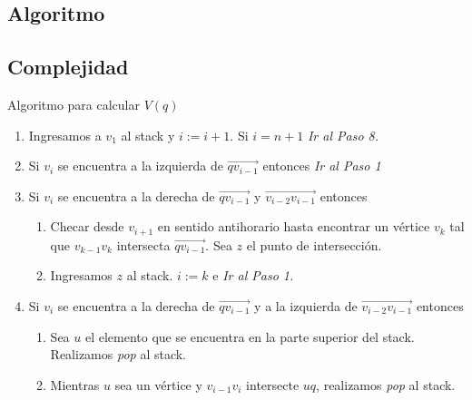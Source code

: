 \documentclass[aspectratio=169,xcolor=dvipsnames, t]{beamer}
\begin{document}

\subsection{Algoritmo}
\subsection{Complejidad}

\begin{frame}{Algoritmo para calcular $V(q)$}
    \begin{enumerate}
            \item Ingresamos a $v_{1}$ al stack y $i := i + 1$. Si $i = n + 1$ \textit{Ir al Paso 8.}
            \item Si $v_{i}$ se encuentra a la izquierda de $\overrightarrow{qv_{i-1}}$ entonces \textit{Ir al Paso 1}
            \item Si $v_{i}$ se encuentra a la derecha de $\overrightarrow{qv_{i-1}}$ y $\overrightarrow{v_{i-2}v_{i-1}}$ entonces
                \begin{enumerate}
                    \item Checar desde $v_{i+1}$ en sentido antihorario hasta encontrar un vértice $v_{k}$ tal que $v_{k-1}v_{k}$ intersecta $\overrightarrow{qv_{i-1}}$. Sea $z$ el punto de intersección.
                    \item Ingresamos $z$ al stack. $i := k$ e \textit{Ir al Paso 1.}
                \end{enumerate}
            \item Si $v_{i}$ se encuentra a la derecha de $\overrightarrow{qv_{i-1}}$ y a la izquierda de $\overrightarrow{v_{i-2}v_{i-1}}$ entonces
                \begin{enumerate}
                    \item Sea $u$ el elemento que se encuentra en la parte superior del stack. Realizamos \textit{pop} al stack.
                    \item Mientras $u$ sea un vértice y $v_{i-1}v_{i}$ intersecte $uq$, realizamos \textit{pop} al stack. 
                \end{enumerate}
    \end{enumerate}
\end{frame}
\end{document}
